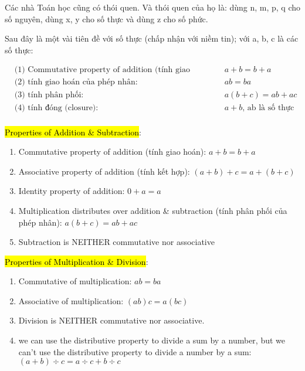 Các nhà Toán học cũng có thói quen. Và thói quen của họ là: dùng n, m, p, q cho số nguyên, dùng x, y cho số thực và dùng z cho số phức.

Sau đây là một vài tiên đề với số thực (chấp nhận với niềm tin); với a, b, c là các số thực:

\begin{equation}
    \begin{aligned}
      &\text{(1) Commutative property of addition (tính giao hoán): } &&a+b = b+a\\
      &\text{(2) tính giao hoán của phép nhân: } &&ab = ba\\
      &\text{(3) tính phân phối: } &&a(b+c) = ab + ac\\
      &\text{(4) tính đóng (closure): } &&a + b \text{, ab là số thực}\\
    \end{aligned}
    \label{key}
\end{equation}

\hl{Properties of Addition \& Subtraction}:

\begin{enumerate}
  \item Commutative property of addition (tính giao hoán): $a+b = b+a$
  \item Associative property of addition (tính kết hợp): $(a+b)+c=a+(b+c)$
  \item Identity property of addition: $0+a=a$
  \item Multiplication distributes over addition \& subtraction (tính phân phối của phép nhân): $a(b+c)=ab+ac$
  \item Subtraction is NEITHER commutative nor associative
\end{enumerate}

\hl{Properties of Multiplication \& Division}:

\begin{enumerate}
  \item Commutative of multiplication: $ab=ba$
  \item Associative of multiplication: $(ab)c=a(bc)$
  \item Division is NEITHER commutative nor associative.
  \item we can use the distributive property to divide a sum by a number, but we can’t use the distributive property to divide a number by a sum: $(a+b)\div c=a\div c + b\div c$
\end{enumerate}

